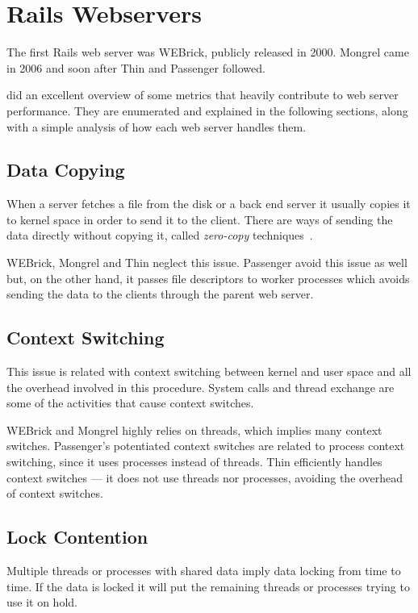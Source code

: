 \section{Rails Webservers} %
\label{state:sec:rails_webservers}
The first Rails web server was WEBrick, publicly released in 2000. Mongrel came in 2006 and soon after Thin and Passenger followed.

\cite{ruby_webservers} did an excellent overview of some metrics that heavily contribute to web server performance. They are enumerated and explained in the following sections, along with a simple analysis of how each web server handles them.

\subsection{Data Copying}
When a server fetches a file from the disk or a back end server it usually copies it to kernel space in order to send it to the client. There are ways of sending the data directly without copying it, called \textit{zero-copy} techniques~\cite{ zero-copy_data_transfer}.

WEBrick, Mongrel and Thin neglect this issue. Passenger avoid this issue as well but, on the other hand, it passes file descriptors to worker processes which avoids sending the data to the clients through the parent web server.

\subsection{Context Switching}
This issue is related with context switching between kernel and user space and all the overhead involved in this procedure. System calls and thread exchange are some of the activities that cause context switches.

WEBrick and Mongrel highly relies on threads, which implies many context switches.  Passenger's potentiated context switches are related to process context switching, since it uses processes instead of threads. Thin efficiently handles context switches --- it does not use threads nor processes, avoiding the overhead of context switches.

\subsection{Lock Contention} 
Multiple threads or processes with shared data imply data locking from time to time. If the data is locked it will put the remaining threads or processes trying to use it on hold.

